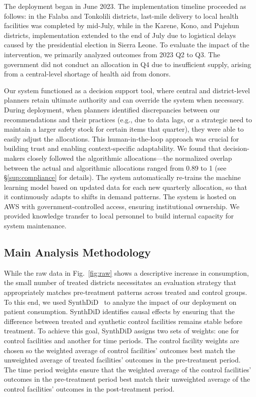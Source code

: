 \documentclass[12pt]{article}
\begin{document}
The deployment began in June 2023. The implementation timeline proceeded as follows: in the Falaba and Tonkolili districts, last-mile delivery to local health facilities was completed by mid-July, while in the Karene, Kono, and Pujehun districts, implementation extended to the end of July due to logistical delays caused by the presidential election in Sierra Leone. To evaluate the impact of the intervention, we primarily analyzed outcomes from 2023 Q2 to Q3. The government did not conduct an allocation in Q4 due to insufficient supply, arising from a central-level shortage of health aid from donors.

Our system functioned as a decision support tool, where central and district-level planners retain ultimate authority and can override the system when necessary. During deployment, when planners identified discrepancies between our recommendations and their practices (e.g., due to data lags, or a strategic need to maintain a larger safety stock for certain items that quarter), they were able to easily adjust the allocations. This human-in-the-loop approach was crucial for building trust and enabling context-specific adaptability. We found that decision-makers closely followed the algorithmic allocations---the normalized overlap between the actual and algorithmic allocations ranged from 0.89 to 1 (see \S\ref{sup:compliance} for details).
The system automatically re-trains the machine learning model based on updated data for each new quarterly allocation, so that it continuously adapts to shifts in demand patterns. The system is hosted on AWS with government-controlled access, ensuring institutional ownership. We provided knowledge transfer to local personnel to build internal capacity for system maintenance.






\subsection{Main Analysis Methodology}
\label{sup:mainanalysis}

While the raw data in Fig.~\ref{fig:raw} shows a descriptive increase in consumption, the small number of treated districts necessitates an evaluation strategy that appropriately matches pre-treatment patterns across treated and control groups. To this end, we used SynthDiD~\cite{arkhangelsky2021synthetic} to analyze the impact of our deployment on patient consumption. SynthDiD identifies causal effects by ensuring that the difference between treated and synthetic control facilities remains stable before treatment. To achieve this goal, SynthDiD assigns two sets of weights: one for control facilities and another for time periods. The control facility weights are chosen so the weighted average of control facilities' outcomes best match the unweighted average of treated facilities' outcomes in the pre-treatment period. The time period weights ensure that the weighted average of the control facilities' outcomes in the pre-treatment period best match their unweighted average of the control facilities' outcomes in the post-treatment period.
\end{document}
